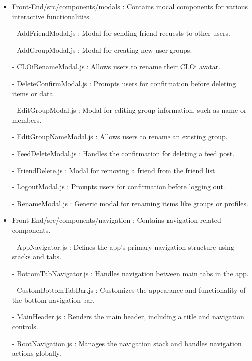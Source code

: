 \begin{itemize}
                    \item Front-End/src/components/modals : Contains modal components for various interactive functionalities.
                        \item[-] AddFriendModal.js : Modal for sending friend requests to other users.
                        \item[-] AddGroupModal.js : Modal for creating new user groups.
                        \item[-] CLOiRenameModal.js : Allows users to rename their CLOi avatar.
                        \item[-] DeleteConfirmModal.js : Prompts users for confirmation before deleting items or data.
                        \item[-] EditGroupModal.js : Modal for editing group information, such as name or members.
                        \item[-] EditGroupNameModal.js : Allows users to rename an existing group.
                        \item[-] FeedDeleteModal.js : Handles the confirmation for deleting a feed post.
                        \item[-] FriendDelete.js : Modal for removing a friend from the friend list.
                        \item[-] LogoutModal.js : Prompts users for confirmation before logging out.
                        \item[-] RenameModal.js : Generic modal for renaming items like groups or profiles.
                    \vspace{3mm}
                
                    \item Front-End/src/components/navigation : Contains navigation-related components.
                        \item[-] AppNavigator.js : Defines the app's primary navigation structure using stacks and tabs.
                        \item[-] BottomTabNavigator.js : Handles navigation between main tabs in the app.
                        \item[-] CustomBottomTabBar.js : Customizes the appearance and functionality of the bottom navigation bar.
                        \item[-] MainHeader.js : Renders the main header, including a title and navigation controls.
                        \item[-] RootNavigation.js : Manages the navigation stack and handles navigation actions globally.
                    \vspace{3mm}
                

\end{itemize}
